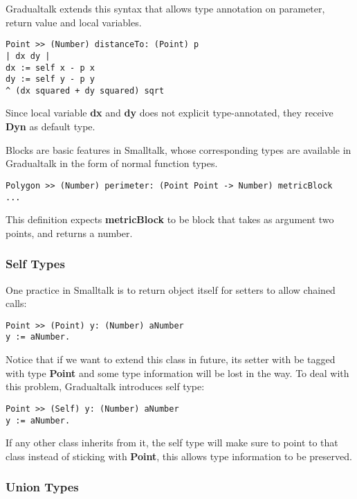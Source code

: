 Gradualtalk extends this syntax that allows
type annotation on parameter, return value and local variables.

\begin{verbatim}
Point >> (Number) distanceTo: (Point) p
| dx dy |
dx := self x - p x
dy := self y - p y
^ (dx squared + dy squared) sqrt
\end{verbatim}

Since local variable \textbf{dx} and \textbf{dy} does not explicit type-annotated,
they receive \textbf{Dyn} as default type.

Blocks are basic features in Smalltalk,
whose corresponding types are available in Gradualtalk in the form of normal function types.

\begin{verbatim}
Polygon >> (Number) perimeter: (Point Point -> Number) metricBlock
...
\end{verbatim}

This definition expects \textbf{metricBlock} to be block
that takes as argument two points, and returns a number.

\subsubsection{Self Types}

One practice in Smalltalk is to return object itself for setters
to allow chained calls:

\begin{verbatim}
Point >> (Point) y: (Number) aNumber
y := aNumber.
\end{verbatim}

Notice that if we want to extend this class in future,
its setter with be tagged with type \textbf{Point} and some
type information will be lost in the way.
To deal with this problem, Gradualtalk introduces self type:

\begin{verbatim}
Point >> (Self) y: (Number) aNumber
y := aNumber.
\end{verbatim}

If any other class inherits from it, the self type will make sure
to point to that class instead of sticking with \textbf{Point},
this allows type information to be preserved.

\subsubsection{Union Types}

